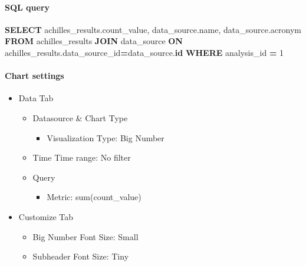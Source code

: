 \documentclass[
]{book}
\newenvironment{Shaded}{\begin{snugshade}}{\end{snugshade}}
\newcommand{\DecValTok}[1]{\textcolor[rgb]{0.00,0.00,0.81}{#1}}
\newcommand{\KeywordTok}[1]{\textcolor[rgb]{0.13,0.29,0.53}{\textbf{#1}}}
\newcommand{\NormalTok}[1]{#1}
\newcommand{\OperatorTok}[1]{\textcolor[rgb]{0.81,0.36,0.00}{\textbf{#1}}}
\providecommand{\tightlist}{%
  \setlength{\itemsep}{0pt}\setlength{\parskip}{0pt}}
\begin{document}
\hypertarget{sql-query-1}{%
\paragraph*{SQL query}\label{sql-query-1}}

\begin{Shaded}
\begin{Highlighting}[]
\KeywordTok{SELECT}
\NormalTok{  achilles\_results.count\_value,}
\NormalTok{  data\_source.name,}
\NormalTok{  data\_source.acronym}
\KeywordTok{FROM}\NormalTok{ achilles\_results}
\KeywordTok{JOIN}\NormalTok{ data\_source }\KeywordTok{ON}\NormalTok{ achilles\_results.data\_source\_id}\OperatorTok{=}\NormalTok{data\_source.}\KeywordTok{id}
\KeywordTok{WHERE}\NormalTok{ analysis\_id }\OperatorTok{=} \DecValTok{1}
\end{Highlighting}
\end{Shaded}

\hypertarget{chart-settings-1}{%
\paragraph*{Chart settings}\label{chart-settings-1}}

\begin{itemize}
\tightlist
\item
  Data Tab

  \begin{itemize}
  \tightlist
  \item
    Datasource \& Chart Type

    \begin{itemize}
    \tightlist
    \item
      Visualization Type: Big Number
    \end{itemize}
  \item
    Time
    Time range: No filter
  \item
    Query

    \begin{itemize}
    \tightlist
    \item
      Metric: sum(count\_value)
    \end{itemize}
  \end{itemize}
\item
  Customize Tab

  \begin{itemize}
  \tightlist
  \item
    Big Number Font Size: Small
  \item
    Subheader Font Size: Tiny
  \end{itemize}
\end{itemize}
\end{document}
